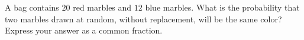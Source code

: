 A bag contains $20$ red marbles and $12$ blue marbles. What is the probability that two marbles drawn at random, without replacement, will be the same color? Express your answer as a common fraction.
